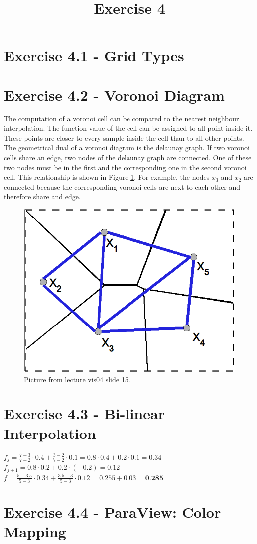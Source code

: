 \documentclass[a4paper]{article}
\date{}
\author{}
\title{Exercise 4}
\begin{document}
	
	\maketitle 
	\thispagestyle{fancy}
	

	
	\section*{Exercise 4.1 - Grid Types}
	
	\section*{Exercise 4.2 - Voronoi Diagram}
	
	The computation of a voronoi cell can be compared to the nearest neighbour interpolation. 
	The function value of the cell can be assigned to all point inside it. 
	These points are closer to every sample inside the cell than to all other points. \\ \linebreak
	The geometrical dual of a voronoi diagram is the delaunay graph. 
	If two voronoi cells share an edge, two nodes of the delaunay graph are connected. 
	One of these two nodes must be in the first and the corresponding one in the second voronoi cell. 
	This relationship is shown in Figure \ref{fig:diagram}. 
	For example, the nodes $x_{3}$ and $x_{2}$ are connected because the corresponding voronoi cells are next to each other and therefore share and edge. 
	
	\begin{figure}[h!]
		\centering
		\includegraphics[width=0.3\linewidth]{diagram}
		\caption{Picture from lecture vis04 slide 15.}
		\label{fig:diagram}
	\end{figure}
	
	\section*{Exercise 4.3 - Bi-linear Interpolation}
	
	$f_{j} = \frac{7 - 3}{7 - 2} \cdot 0.4 + \frac{3 - 2}{7 - 2} \cdot 0.1 = 0.8 \cdot 0.4 + 0.2 \cdot 0.1 = 0.34$ \\ \linebreak
	$f_{j + 1}  = 0.8 \cdot 0.2 + 0.2 \cdot (-0.2) = 0.12$ \\ \linebreak
	$f = \frac{5 - 3.5}{5 - 3} \cdot 0.34 + \frac{3.5 - 3}{5 - 3} \cdot 0.12 = 0.255 + 0.03 = \textbf{0.285}$
	
	\section*{Exercise 4.4 - ParaView: Color Mapping}
	
	
	
\end{document}
